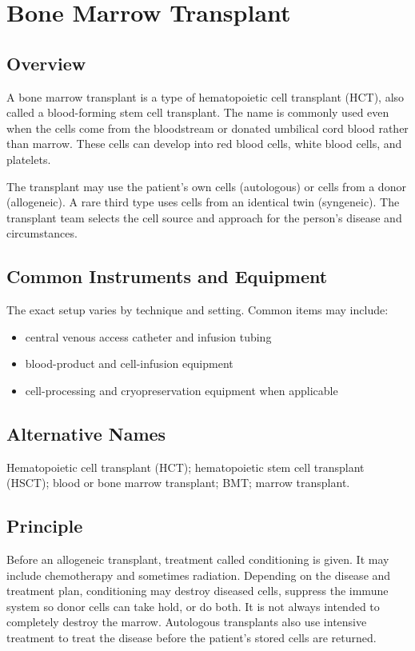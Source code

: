 \chapter{Bone Marrow Transplant}

\section*{Overview}
A bone marrow transplant is a type of hematopoietic cell transplant (HCT), also called a blood-forming stem cell transplant. The name is commonly used even when the cells come from the bloodstream or donated umbilical cord blood rather than marrow. These cells can develop into red blood cells, white blood cells, and platelets.

The transplant may use the patient's own cells (autologous) or cells from a donor (allogeneic). A rare third type uses cells from an identical twin (syngeneic). The transplant team selects the cell source and approach for the person's disease and circumstances.

\section*{Common Instruments and Equipment}
The exact setup varies by technique and setting. Common items may include:
\begin{itemize}[nosep,leftmargin=*]
  \item central venous access catheter and infusion tubing
  \item blood-product and cell-infusion equipment
  \item cell-processing and cryopreservation equipment when applicable
\end{itemize}

\section*{Alternative Names}
Hematopoietic cell transplant (HCT); hematopoietic stem cell transplant (HSCT); blood or bone marrow transplant; BMT; marrow transplant.

\section*{Principle}
Before an allogeneic transplant, treatment called conditioning is given. It may include chemotherapy and sometimes radiation. Depending on the disease and treatment plan, conditioning may destroy diseased cells, suppress the immune system so donor cells can take hold, or do both. It is not always intended to completely destroy the marrow. Autologous transplants also use intensive treatment to treat the disease before the patient's stored cells are returned.

